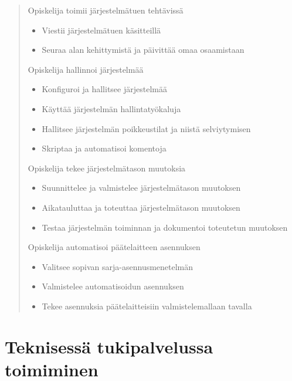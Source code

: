 \documentclass[../wifi-security.tex]{subfiles}
\begin{document}
\begin{quote}
Opiskelija toimii järjestelmätuen tehtävissä
\begin{itemize}
\item Viestii järjestelmätuen käsitteillä
\item Seuraa alan kehittymistä ja päivittää omaa osaamistaan
\end{itemize}
Opiskelija hallinnoi järjestelmää
\begin{itemize}
\item Konfiguroi ja hallitsee järjestelmää
\item Käyttää järjestelmän hallintatyökaluja
\item Hallitsee järjestelmän poikkeustilat ja niistä selviytymisen
\item Skriptaa ja automatisoi komentoja
\end{itemize}
Opiskelija tekee järjestelmätason muutoksia
\begin{itemize}
\item Suunnittelee ja valmistelee järjestelmätason muutoksen
\item Aikatauluttaa ja toteuttaa järjestelmätason muutoksen
\item Testaa järjestelmän toiminnan ja dokumentoi toteutetun muutoksen
\end{itemize}
Opiskelija automatisoi päätelaitteen asennuksen
\begin{itemize}
\item Valitsee sopivan sarja-asennusmenetelmän
\item Valmistelee automatisoidun asennuksen
\item Tekee asennuksia päätelaitteisiin valmistelemallaan tavalla
\end{itemize}
\end{quote}

\section{Teknisessä tukipalvelussa toimiminen}
\end{document}
